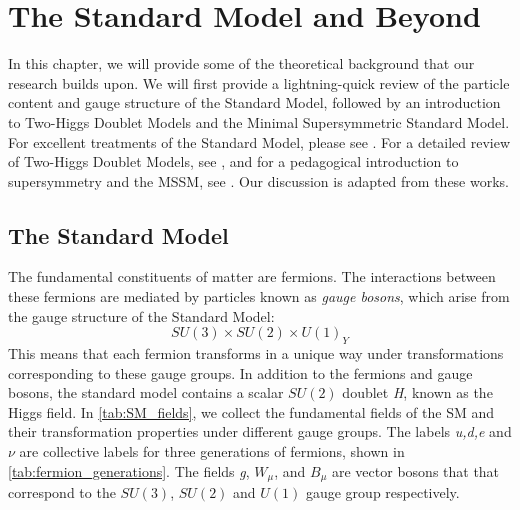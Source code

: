 \chapter{The Standard Model and Beyond}\label{ch:theory}

\newcommand{\ct}{\cos\theta_w}
\newcommand{\st}{\sin\theta_w}

In this chapter, we will provide some of the theoretical background that our research builds upon. We will first provide a lightning-quick review of the particle content and gauge structure of the Standard Model, followed by an introduction to Two-Higgs Doublet Models and the Minimal Supersymmetric Standard Model. For excellent treatments of the Standard Model, please see \citep{Cheng:1984,Schwartz:2014,Zee:2003mt,Peskin:1995ev}. For a detailed review of Two-Higgs Doublet Models, see  \cite{Branco:2011iw}, and for a pedagogical introduction to supersymmetry and the MSSM, see \cite{Martin:1997ns}. Our discussion is adapted from these works. 

\section{The Standard Model}\label{sec:sm}

The fundamental constituents of matter are fermions. The interactions between these fermions are mediated by particles known as \emph{gauge bosons}, which arise from the gauge structure of the Standard Model:
\[SU(3)\times SU(2)\times U(1)_Y\]
This means that each fermion transforms in a unique way under transformations corresponding to these gauge groups. In addition to the fermions and gauge bosons, the standard model contains a scalar $SU(2)$ doublet \emph{H}, known as the Higgs field. In \autoref{tab:SM_fields}, we collect the fundamental fields of the SM and their transformation properties under different gauge groups. The labels \emph{u,d,e} and $\nu$ are collective labels for three generations of fermions, shown in \autoref{tab:fermion_generations}. The fields \emph{g}, $W_\mu$, and $B_\mu$ are vector bosons that that correspond to the $SU(3)$, $SU(2)$ and $U(1)$ gauge group respectively.

